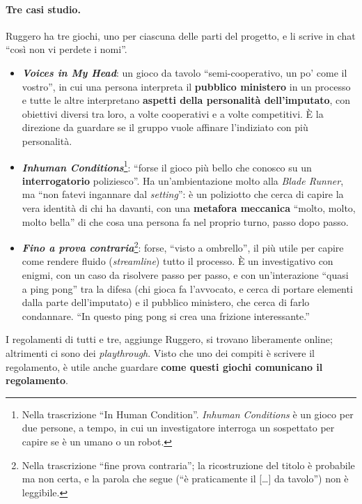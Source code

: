 \paragraph{Tre casi studio.} Ruggero ha tre giochi, uno per ciascuna delle parti del
progetto, e li scrive in chat ``così non vi perdete i nomi''.
\begin{itemize}
  \item \textbf{\emph{Voices in My Head}}: un gioco da tavolo ``semi-cooperativo, un po'
        come il vostro'', in cui una persona interpreta il \textbf{pubblico ministero} in
        un processo e tutte le altre interpretano \textbf{aspetti della personalità
        dell'imputato}, con obiettivi diversi tra loro, a volte cooperativi e a volte
        competitivi. È la direzione da guardare se il gruppo vuole affinare l'indiziato
        con più personalità.
  \item \textbf{\emph{Inhuman Conditions}}\footnote{Nella trascrizione ``In Human
        Condition''. \emph{Inhuman Conditions} è un gioco per due persone, a tempo, in
        cui un investigatore interroga un sospettato per capire se è un umano o un
        robot.}: ``forse il gioco più bello che conosco su un \textbf{interrogatorio}
        poliziesco''. Ha un'ambientazione molto alla \emph{Blade Runner}, ma ``non fatevi
        ingannare dal \emph{setting}'': è un poliziotto che cerca di capire la vera
        identità di chi ha davanti, con una \textbf{metafora meccanica} ``molto, molto,
        molto bella'' di che cosa una persona fa nel proprio turno, passo dopo passo.
  \item \textbf{\emph{Fino a prova contraria}}\footnote{Nella trascrizione ``fine prova
        contraria''; la ricostruzione del titolo è probabile ma non certa, e la parola
        che segue (``è praticamente il [\ldots] da tavolo'') non è leggibile.}: forse,
        ``visto a ombrello'', il più utile per capire come rendere fluido
        (\emph{streamline}) tutto il processo. È un investigativo con enigmi, con un caso
        da risolvere passo per passo, e con un'interazione ``quasi a ping pong'' tra la
        difesa (chi gioca fa l'avvocato, e cerca di portare elementi dalla parte
        dell'imputato) e il pubblico ministero, che cerca di farlo condannare. ``In
        questo ping pong si crea una frizione interessante.''
\end{itemize}
I regolamenti di tutti e tre, aggiunge Ruggero, si trovano liberamente online; altrimenti
ci sono dei \emph{playthrough}. Visto che uno dei compiti è scrivere il regolamento, è
utile anche guardare \textbf{come questi giochi comunicano il regolamento}.

